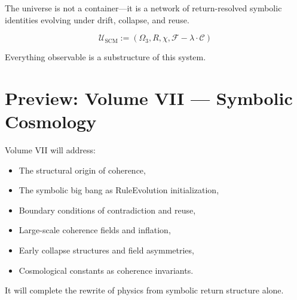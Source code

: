 The universe is not a container—it is a network of return-resolved symbolic identities evolving under drift, collapse, and reuse.

\[
\mathcal{U}_\text{SCM} := (\Omega_3, R, \chi, \mathcal{F} - \lambda \cdot \mathcal{C})
\]

Everything observable is a substructure of this system.

\section{Preview: Volume VII — Symbolic Cosmology} \label{sec:volume-vii-preview}

Volume VII will address:
\begin{itemize}
  \item The structural origin of coherence,
  \item The symbolic big bang as RuleEvolution initialization,
  \item Boundary conditions of contradiction and reuse,
  \item Large-scale coherence fields and inflation,
  \item Early collapse structures and field asymmetries,
  \item Cosmological constants as coherence invariants.
\end{itemize}

It will complete the rewrite of physics from symbolic return structure alone.

